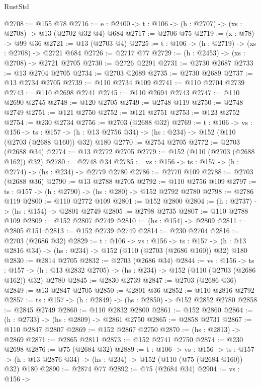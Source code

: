 \begin{lexlean}{RustStd}
\begin{coremodule}
@2708 := @155 @78
@2716 := {e : @2400} -> {t : @106} -> (h : @2707) -> (xs : @2708) -> @13 (@2702 @32 @4) @684
@2717 := @2706 @75
@2719 := (x : @78) -> @99 @36
@2721 := @13 (@2703 @4)
@2725 := {t : @106} -> (h : @2719) -> (xs : @2708) -> @2721 @684
@2726 := @2717 @77
@2729 := (h : @2453) -> (xs : @2708) -> @2721 @2705
@2730 := @2726 @2291
@2731 := @2730 @2687
@2733 := @13 @2704 @2705
@2734 := @2703 @2689
@2735 := @2730 @2689
@2737 := @13 @2734 @2705
@2739 := @110 @2734 @109
@2741 := @110 @2704 @2739
@2743 := @110 @2698 @2741
@2745 := @110 @2694 @2743
@2747 := @110 @2690 @2745
@2748 := @120 @2705
@2749 := @2748 @119
@2750 := @2748 @2749
@2751 := @121 @2750
@2752 := @121 @2751
@2753 := @123 @2752
@2754 := @230 @2734
@2756 := @2703 (@2688 @32)
@2769 := {t : @106} ->
  {vs : @156} ->
  {ts : @157} -> (h : @13 @2756 @34) -> (hs : @234) -> @152 (@110 (@2703 (@2688 @160)) @32) @180
@2770 := @2754 @2705
@2772 := @2703 (@2688 @34)
@2774 := @13 @2772 @2705
@2779 := @152 (@110 (@2703 (@2688 @162)) @32)
@2780 := @2748 @34
@2785 := {vs : @156} -> {ts : @157} -> (h : @2774) -> (hs : @234) -> @2779 @2780
@2786 := @2770 @109
@2788 := @2703 (@2688 @36)
@2790 := @13 @2788 @2705
@2792 := @110 @2756 @109
@2797 := {ts : @157} -> (h : @2790) -> (hs : @280) -> @152 @2792 @2780
@2798 := @2786 @119
@2800 := @110 @2772 @109
@2801 := @152 @2800
@2804 := (h : @2737) -> (hs : @154) -> @2801 @2749
@2805 := @2798 @2735
@2807 := @110 @2788 @109
@2809 := @152 @2807 @2749
@2810 := (hs : @154) -> @2809
@2811 := @2805 @151
@2813 := @152 @2739 @2749
@2814 := @230 @2704
@2816 := @2703 (@2686 @32)
@2829 := {t : @106} ->
  {vs : @156} ->
  {ts : @157} -> (h : @13 @2816 @34) -> (hs : @234) -> @152 (@110 (@2703 (@2686 @160)) @32) @180
@2830 := @2814 @2705
@2832 := @2703 (@2686 @34)
@2844 := {vs : @156} ->
  {ts : @157} -> (h : @13 @2832 @2705) -> (hs : @234) -> @152 (@110 (@2703 (@2686 @162)) @32) @2780
@2845 := @2830 @2739
@2847 := @2703 (@2686 @36)
@2849 := @13 @2847 @2705
@2850 := @2801 @36
@2852 := @110 @2816 @2792
@2857 := {ts : @157} -> (h : @2849) -> (hs : @2850) -> @152 @2852 @2780
@2858 := @2845 @2749
@2860 := @110 @2832 @2800
@2861 := @152 @2860
@2864 := (h : @2733) -> (hs : @2809) -> @2861 @2750
@2865 := @2858 @2731
@2867 := @110 @2847 @2807
@2869 := @152 @2867 @2750
@2870 := (hs : @2813) -> @2869
@2871 := @2865 @2811
@2873 := @152 @2741 @2750
@2874 := @230 @2698
@2876 := @75 (@2684 @32)
@2889 := {t : @106} ->
  {vs : @156} ->
  {ts : @157} -> (h : @13 @2876 @34) -> (hs : @234) -> @152 (@110 (@75 (@2684 @160)) @32) @180
@2890 := @2874 @77
@2892 := @75 (@2684 @34)
@2904 := {vs : @156} ->

\end{coremodule}
\end{lexlean}
